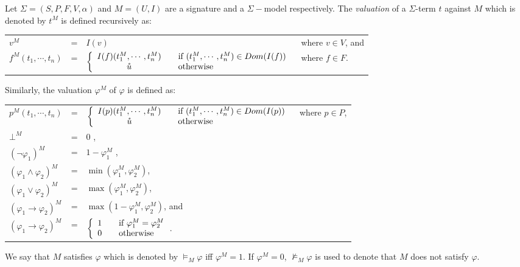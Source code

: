 \begin{definition} \label{def:smt-valuation}
Let $\Sigma = (S, P, F, V, \alpha)$ and $M=(U, I)$ are a signature and a $\Sigma-$model respectively. The \emph{valuation} of a $\Sigma$-term $t$ against $M$ which is denoted by $t^M$ is defined recursively as:
\begin{center}
\begin{tabular}{l c l l}
$v^M$ &=& $I(v)$ & where $v \in V$, and\\
$f^M(t_1, \cdots, t_n)$ &=& $\left\{ 
  \begin{array}{c l}
    I(f)(t_1^M, \cdots, t_n^M) & \quad \text{if } (t_1^M, \cdots, t_n^M) \in Dom(I(f))\\
    \mathring{u} & \quad \text{otherwise }\\
  \end{array} \right.$ & where $f \in F$. \\
\end{tabular}
\end{center}
Similarly, the valuation $\varphi^M$ of $\varphi$ is defined as:
\begin{center}
\begin{tabular}{l c l l}
$p^M(t_1,\cdots,t_n)$ &=& $\left\{ 
  \begin{array}{c l}
    I(p)(t_1^M,\cdots,t_n^M) & \quad \text{if } (t_1^M, \cdots, t_n^M) \in Dom(I(p))\\
    \mathring{u} & \quad \text{otherwise }\\
  \end{array} \right.$ & where $p \in P$, \\
$\bot^M$ &=& $0$ ,& \\
$(\neg \varphi_1)^M$ &=& $1 - \varphi_1^M$ ,& \\
$(\varphi_1 \wedge \varphi_2)^M$ &=& $\min(\varphi_1^M, \varphi_2^M)$, & \\
$(\varphi_1 \vee \varphi_2)^M$ &=& $\max(\varphi_1^M, \varphi_2^M)$, & \\
$(\varphi_1 \rightarrow \varphi_2)^M$ &=& $\max(1-\varphi_1^M, \varphi_2^M)$, and & \\
$(\varphi_1 \rightarrow \varphi_2)^M$ &=& $\left\{ 
  \begin{array}{c l}
    1 & \quad \text{if } \varphi_1^M = \varphi_2^M \\
    0 & \quad \text{otherwise }\\
  \end{array} \right.$. &
\end{tabular}
\end{center}
We say that $M$ satisfies $\varphi$ which is denoted by $\models_M \varphi$ iff $\varphi^M = 1$. If $\varphi^M = 0$, $\not\models_M \varphi$ is used to denote that $M$ does not satisfy $\varphi$.
\end{definition}

